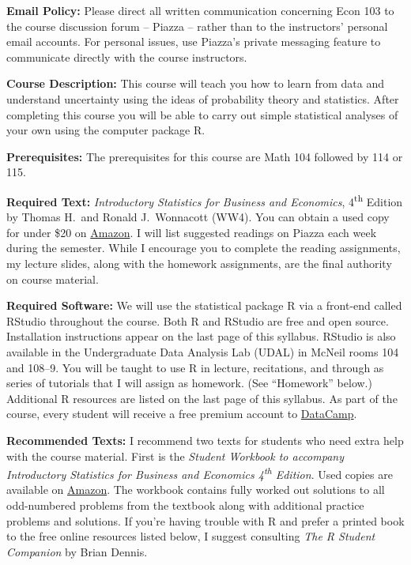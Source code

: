 \documentclass[11pt, letterpaper]{article}
\begin{document}
\noindent \textbf{Email Policy:}
Please direct all written communication concerning Econ 103 to the course discussion forum -- Piazza -- rather than to the instructors' personal email accounts.
For personal issues, use Piazza's private messaging feature to communicate directly with the course instructors. 

\medskip



\noindent \textbf{Course Description:} 
This course will teach you how to learn from data and understand uncertainty using the ideas of probability theory and statistics. 
After completing this course you will be able to carry out simple statistical analyses of your own using the computer package R.


\medskip


\noindent \textbf{Prerequisites:} 
The prerequisites for this course are Math 104 followed by 114 or 115. 



\medskip

\noindent \textbf{Required Text:} 
\emph{Introductory Statistics for Business and Economics}, 4\textsuperscript{th} Edition by Thomas H.\ and Ronald J.\ Wonnacott (WW4). 
You can obtain a used copy for under \$20 on \href{http://tinyurl.com/ECON103-2013A}{Amazon}.
I will list suggested readings on Piazza each week during the semester.
While I encourage you to complete the reading assignments, my lecture slides, along with the homework assignments, are the final authority on course material.

\medskip


\noindent \textbf{Required Software:} 
We will use the statistical package R via a front-end called RStudio throughout the course. 
Both R and RStudio are free and open source. Installation instructions appear on the last page of this syllabus.
RStudio is also available in the Undergraduate Data Analysis Lab (UDAL) in McNeil rooms 104 and 108--9. 
You will be taught to use R in lecture, recitations, and through as series of tutorials that I will assign as homework. (See ``Homework'' below.)  
Additional R resources are listed on the last page of this syllabus.
As part of the course, every student will receive a free premium account to \href{https://datacamp.com}{DataCamp}.

\medskip

\noindent \textbf{Recommended Texts:} 
I recommend two texts for students who need extra help with the course material. 
First is the \emph{Student Workbook to accompany Introductory Statistics for Business and Economics 4\textsuperscript{th} Edition}. 
Used copies are available on \href{http://www.amazon.com/gp/offer-listing/0471508993/sr=/qid=/ref=olp_page_2?ie=UTF8&colid=&coliid=&condition=all&me=&qid=&shipPromoFilter=0&sort=sip&sr=&startIndex=10}{Amazon}. 
The workbook contains fully worked out solutions to all odd-numbered problems from the textbook along with additional practice problems and solutions.
If you're having trouble with R and prefer a printed book to the free online resources listed below, I suggest consulting \emph{The R Student Companion} by Brian Dennis.
\end{document}
